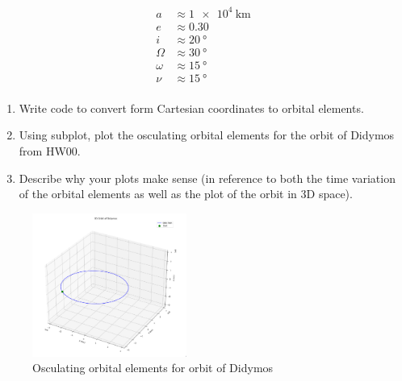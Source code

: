\begin{hwkProblem}{1}{}
	\[
	\boxed{
		\begin{aligned}
			a &\approx \qty{1e4}{\km} \\
			e &\approx 0.30 \\
			i &\approx \qty{20}{\degree} \\
			\Omega &\approx \qty{30}{\degree} \\
			\omega &\approx \qty{15}{\degree} \\
			\nu &\approx \qty{15}{\degree} \\
		\end{aligned}
	}
	\]

\end{hwkProblem}
\begin{hwkProblem}{2}{}

	\begin{enumerate}
		\item Write code to convert form Cartesian coordinates to orbital elements.
		\item Using subplot, plot the osculating orbital elements for the orbit of Didymos from HW00.
		\item Describe why your plots make sense (in reference to both the time variation of the orbital elements as well as the plot of the orbit in 3D space).
	\end{enumerate}

	\hwkSol

	\hwkPart

	

	\hwkPart

	\begin{figure}[H]
		\begin{center}
			\includegraphics[width=0.45\textwidth]{./images/s02b.png}
		\end{center}
		\caption{Osculating orbital elements for orbit of Didymos}\label{fig:s02b}
	\end{figure}


\end{hwkProblem}
